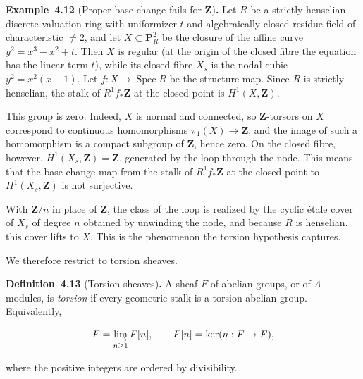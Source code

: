 \documentclass[11pt]{article}
\newenvironment{bpstatement}[2]{\par\addvspace{0.6\baselineskip}\noindent\textbf{#1}#2\textbf{.}\enspace\ignorespaces}
  {\par\addvspace{0.4\baselineskip}}
\begin{document}
\label{bp34}%
\begin{bpstatement}{Example~4.12}{ (Proper base change fails for $\mathbf Z$)}
Let \(R\) be a strictly henselian discrete valuation ring with uniformizer \(t\) and algebraically closed residue field of characteristic \(\neq2\), and let \(X\subset\mathbf P^2_R\) be the closure of the affine curve \(y^2=x^3-x^2+t\). Then \(X\) is regular (at the origin of the closed fibre the equation has the linear term \(t\)), while its closed fibre \(X_s\) is the nodal cubic \(y^2=x^2(x-1)\). Let \(f:X\to\operatorname{Spec}R\) be the structure map. Since \(R\) is strictly henselian, the stalk of \(R^1f_*\mathbf Z\) at the closed point is \(H^1(X,\mathbf Z)\).

This group is zero. Indeed, \(X\) is normal and connected, so \(\mathbf Z\)-torsors on \(X\) correspond to continuous homomorphisms \(\pi_1(X)\to\mathbf Z\), and the image of such a homomorphism is a compact subgroup of \(\mathbf Z\), hence zero. On the closed fibre, however, \(H^1(X_s,\mathbf Z)=\mathbf Z\), generated by the loop through the node. This means that the base change map from the stalk of \(R^1f_*\mathbf Z\) at the closed point to \(H^1(X_s,\mathbf Z)\) is not surjective.

With \(\mathbf Z/n\) in place of \(\mathbf Z\), the class of the loop is realized by the cyclic étale cover of \(X_s\) of degree \(n\) obtained by unwinding the node, and because \(R\) is henselian, this cover lifts to \(X\). This is the phenomenon the torsion hypothesis captures.
\end{bpstatement}

\label{bp35}%
We therefore restrict to torsion sheaves.

\label{bp36}%
\begin{bpstatement}{Definition~4.13}{ (Torsion sheaves)}
A sheaf \(F\) of abelian groups, or of \(\Lambda\)-modules, is \emph{torsion} if every geometric stalk is a torsion abelian group. Equivalently,

\[
F=\varinjlim_{n\geq1}F[n],\qquad F[n]=\ker(n:F\to F),
\]

where the positive integers are ordered by divisibility.
\end{bpstatement}
\end{document}
